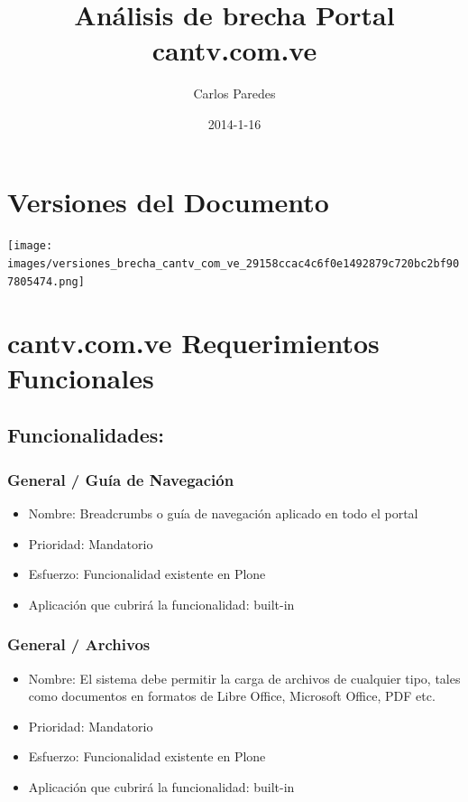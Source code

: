 \documentclass[11pt, letterpaper, oneside, spanish]{scrbook}
\title{Análisis de brecha Portal cantv.com.ve}
\author{Carlos Paredes}
\date{2014-1-16}
\begin{document}
\maketitle

\setcounter{tocdepth}{3}
\tableofcontents
\vspace*{1cm}

\chapter{Versiones del Documento}
\label{sec-1}


\texttt{[image: images/versiones\_brecha\_cantv\_com\_ve\_29158ccac4c6f0e1492879c720bc2bf907805474.png]}
\chapter{cantv.com.ve Requerimientos Funcionales}
\label{sec-2}
\section{Funcionalidades:}
\label{sec-2-1}
\subsection{General / Guía de Navegación}
\label{sec-2-1-1}

\begin{itemize}
\item Nombre: Breadcrumbs o guía de navegación aplicado en todo el portal
\item Prioridad: Mandatorio
\item Esfuerzo: Funcionalidad existente en Plone
\item Aplicación que cubrirá la funcionalidad:  built-in
\end{itemize}
\subsection{General / Archivos}
\label{sec-2-1-2}

\begin{itemize}
\item Nombre: El sistema debe permitir la carga de archivos de cualquier tipo,
  tales como documentos en formatos de Libre Office, Microsoft Office, PDF
  etc.
\item Prioridad: Mandatorio
\item Esfuerzo: Funcionalidad existente en Plone
\item Aplicación que cubrirá la funcionalidad:  built-in
\end{itemize}
\end{document}
